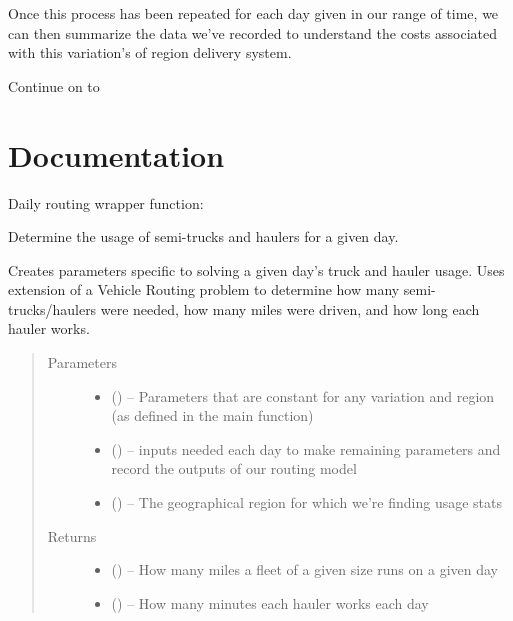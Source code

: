 \documentclass[letterpaper,10pt,english]{sphinxmanual}
\begin{document}
Once this process has been repeated for each day given in our range of time,
we can then summarize the data we've recorded to understand the costs
associated with this variation's of region delivery system.

Continue on to {\hyperref[\detokenize{reporting:reporting}]{}}


\section{Documentation}
\label{\detokenize{daily-routing:documentation}}
Daily routing wrapper function:

\begin{fulllineitems}
\label{\detokenize{daily-routing:iterate.solve_day}}
Determine the usage of semi-trucks and haulers for a given day.

Creates parameters specific to solving a given day's truck and hauler usage.
Uses extension of a Vehicle Routing problem to determine how many
semi-trucks/haulers were needed, how many miles were driven, and how long
each hauler works.
\begin{quote}\begin{description}
\item[{Parameters}] \leavevmode\begin{itemize}
\item {} 
 () -- Parameters that are constant for any variation and region (as defined
in the main function)

\item {} 
 () -- inputs needed each day to make remaining parameters and record the
outputs of our routing model

\item {} 
 () -- The geographical region for which we're finding usage stats

\end{itemize}

\item[{Returns}] \leavevmode
\begin{itemize}
\item {} 
 () -- How many miles a fleet of a given size runs on a given day

\item {} 
 () -- How many minutes each hauler works each day

\end{itemize}


\end{description}\end{quote}

\end{fulllineitems}
\end{document}
